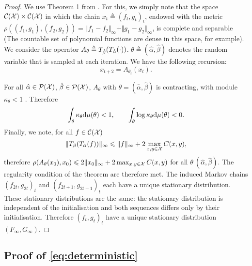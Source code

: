 \begin{proof}
    We use Theorem 1 from \citet{diaconis_iterated}. For this, we simply note
    that the space $\mathcal{C}(\mathcal{X}) \times \mathcal{C}(\mathcal{X})$ in which the chain ${x_t
    \triangleq (f_t, g_t)}_t$, endowed with the metric $\rho((f_1, g_1), (f_2,
    g_2)) = \Vert f_1 - f_2 \Vert_{\infty} + \Vert g_1 - g_2 \Vert_{\infty}$, is
    complete and separable (The countable set of polynomial functions are dense in this space, for example).
    We consider the operator $A_{\theta} \triangleq T_{\hat \beta}(T_{\hat
    \alpha}(\cdot))$. $\theta \triangleq (\hat \alpha, \hat \beta)$ denotes
    the random variable that is sampled at each iteration. We have the following
    recursion:
    \begin{equation}
        x_{t+2} = A_{\theta_t}(x_t).
    \end{equation}
    
    For all $\hat \alpha \in \mathcal{P}(\mathcal{X})$, $\hat \beta \in \mathcal{P}(\mathcal{X})$, $A_{\theta}$
    with $\theta = (\hat \alpha, \hat \beta)$ is contracting, with module
    $\kappa_\theta < 1$ \citep{peyre2019computational}. Therefore
    \begin{equation}
        \int_{\theta} \kappa_\theta \textrm{d} \mu(\theta) < 1, \qquad \int_{\theta}
         \log \kappa_\theta \textrm{d} \mu(\theta) < 0.
    \end{equation}
    Finally, we note, for all $f \in \mathcal{C}(\mathcal{X})$
    \begin{equation}
        \Vert T_{\beta}(T_{\hat \alpha}(f)) \Vert_{\infty} 
        \leqslant \Vert f \Vert_\infty + 2 \max_{x,y \in \mathcal{X}} C(x, y),
    \end{equation}
    therefore $\rho(A_\theta(x_0), x_0) \leqslant 2 \Vert x_0 \Vert_\infty + 2
    \max_{x,y \in \mathcal{X}} C(x, y)$ for all $\theta \ (\hat \alpha, \hat \beta)$.
    The regularity condition of the theorem are therefore met. The induced Markov chains ${(f_{2t},
    g_{2t})}_t$ and ${(f_{2t + 1}, g_{2t + 1})}_t$ each have a unique stationary
    distribution. These stationary distributions are the same: the stationary distribution is independent of the initialisation and both sequences differs only by their initialisation.
    Therefore ${(f_{t}, g_{t})}_t$ have a unique stationary distribution
    $(F_\infty, G_\infty)$.
\end{proof}

\subsection{Proof of \autoref{eq:deterministic}}

